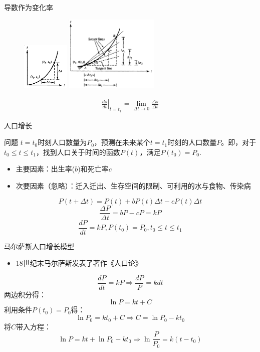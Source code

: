 \documentclass[mathserif, table]{beamer}
\begin{document}
\begin{frame}{导数作为变化率}
  \begin{figure}
    \centering
    \includegraphics[width=0.2\textwidth]{dis.png}
    \includegraphics[width=0.4\textwidth]{slope.png}
  \end{figure}
  
  \[
  \begin{array}{c}
    \left.\frac{ds}{dt}\right|_{t=t_1}=\lim_{\Delta t \rightarrow 0}\frac{\Delta s}{\Delta t}
  \end{array}
  \]
\end{frame}

\begin{frame}{人口增长}
  \begin{block}{问题}
    $t = t_0$时刻人口数量为$P_0$，预测在未来某个$t=t_1$时刻的人口数量$P$。即，对于$t_0 \le t \le t_1$，找到人口关于时间的函数$P(t)$，满足$P(t_0)=P_0$.
  \end{block}
  \begin{itemize}
  \item 主要因素：出生率($b$)和死亡率$c$
  \item 次要因素（忽略）：迁入迁出、生存空间的限制、可利用的水与食物、传染病
  \end{itemize}
  \[
  P(t+\Delta t) = P(t) + bP(t)\Delta t - cP(t)\Delta t
  \]
  \[
  \frac{\Delta P}{\Delta t} = bP - cP = kP
  \]
  \[
  \frac{dP}{dt} = kP, P(t_0)=P_0, t_0 \le t \le t_1
  \]
\end{frame}

\begin{frame}{马尔萨斯人口增长模型}
  \begin{itemize}
  \item 18世纪末马尔萨斯发表了著作《人口论》
  \end{itemize}

  \[
  \frac{dP}{dt} = kP \Rightarrow \frac{dP}{P} = kdt
  \]
  两边积分得：
  \[
  \ln P = kt + C
  \]
  利用条件$P(t_0) = P_0$得：
  \[
  \ln P_0 = kt_0 + C \Rightarrow C = \ln P_0 - kt_0
  \]
  将$C$带入方程：
  \[
  \ln P = kt + \ln P_0 - kt_0 \Rightarrow \ln\frac{P}{P_0} = k(t-t_0)
  \]
  
  
\end{frame}
\end{document}
